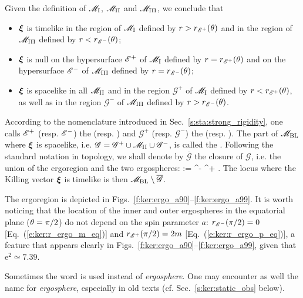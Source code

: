 Given the definition of $\mathscr{M}_{\rm I}$, $\mathscr{M}_{\rm II}$ and $\mathscr{M}_{\rm III}$, we conclude that
\begin{itemize}
\item $\bm{\xi}$ is timelike in the region of $\mathscr{M}_{\rm I}$ defined by $r>r_{\mathscr{E}^+}(\theta)$
and in the region of $\mathscr{M}_{\rm III}$ defined by $r<r_{\mathscr{E}^-}(\theta)$;
\item $\bm{\xi}$ is null on the hypersurface $\mathscr{E}^+$ of $\mathscr{M}_{\rm I}$ defined by
$r=r_{\mathscr{E}^+}(\theta)$
and on the hypersurface $\mathscr{E}^-$ of $\mathscr{M}_{\rm III}$ defined by $r=r_{\mathscr{E}^-}(\theta)$;
\item $\bm{\xi}$ is spacelike in all $\mathscr{M}_{\rm II}$ and in the region
$\mathscr{G}^+$ of $\mathscr{M}_{\rm I}$
defined by $r<r_{\mathscr{E}^+}(\theta)$, as well as
in the region $\mathscr{G}^-$ of $\mathscr{M}_{\rm III}$ defined by $r>r_{\mathscr{E}^-}(\theta)$.
\end{itemize}
According to the nomenclature introduced in Sec.~\ref{s:sta:strong_rigidity},
one calls $\mathscr{E}^+$ (resp. $\mathscr{E}^-$) the
(resp. )
and $\mathscr{G}^+$ (resp. $\mathscr{G}^-$) the
(resp. ).
The part of $\mathscr{M}_{\rm BL}$ where $\bm{\xi}$ is spacelike, i.e.
$\mathscr{G} = \mathscr{G}^+ \cup \mathscr{M}_{\rm II} \cup \mathscr{G}^-$,
is called the .
Following the standard notation in topology, we shall denote
by $\overline{\mathscr{G}}$ the closure of $\mathscr{G}$, i.e. the
union of the ergoregion and the two ergospheres:
\be
     :=  \cup \E^- \cup \E^+ .
\ee
The locus where the Killing vector $\bm{\xi}$ is timelike is then
$\mathscr{M}_{\rm BL}\setminus \overline{\mathscr{G}}$.

The ergoregion is depicted in Figs.~\ref{f:ker:ergo_a90}--\ref{f:ker:ergo_a99}.
It is worth noticing that
the location of the inner and outer ergospheres in the equatorial
plane ($\theta=\pi/2$) do not depend on the spin parameter $a$:
$r_{\mathscr{E}^-}(\pi/2) = 0$ [Eq.~(\ref{e:ker:r_ergo_m_eq})] and
$r_{\mathscr{E}^+}(\pi/2) = 2m$ [Eq.~(\ref{e:ker:r_ergo_p_eq})], a feature
that appears clearly in Figs.~\ref{f:ker:ergo_a90}--\ref{f:ker:ergo_a99},
given that $\mathrm{e}^2 \simeq 7.39$.

\begin{remark} \label{r:ker:static_limit}
Sometimes the word  is used instead of
\emph{ergosphere}. One may encounter as well the name 
for \emph{ergosphere}, especially in old texts (cf. Sec.~\ref{s:ker:static_obs} below).
\end{remark}

